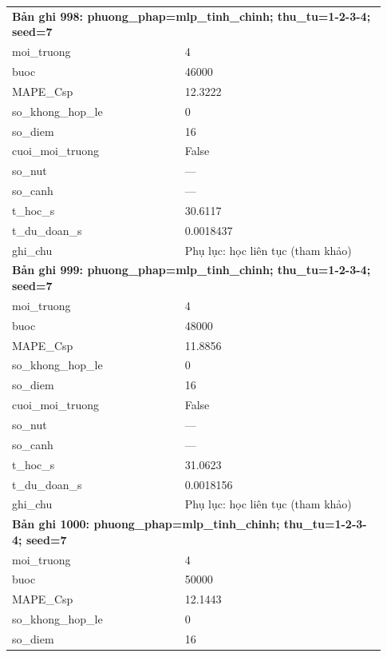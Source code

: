 \begin{longtable}{p{0.43\linewidth}p{0.50\linewidth}}
\midrule
\multicolumn{2}{p{0.95\linewidth}}{\textbf{Bản ghi 998: phuong\_phap=mlp\_tinh\_chinh; thu\_tu=1-2-3-4; seed=7}} \\
moi\_\allowbreak truong & 4 \\
buoc & 46000 \\
MAPE\_\allowbreak Csp & 12.3222 \\
so\_\allowbreak khong\_\allowbreak hop\_\allowbreak le & 0 \\
so\_\allowbreak diem & 16 \\
cuoi\_\allowbreak moi\_\allowbreak truong & False \\
so\_\allowbreak nut & — \\
so\_\allowbreak canh & — \\
t\_\allowbreak hoc\_\allowbreak s & 30.6117 \\
t\_\allowbreak du\_\allowbreak doan\_\allowbreak s & 0.0018437 \\
ghi\_\allowbreak chu & Phụ lục: học liên tục (tham khảo) \\
\midrule
\multicolumn{2}{p{0.95\linewidth}}{\textbf{Bản ghi 999: phuong\_phap=mlp\_tinh\_chinh; thu\_tu=1-2-3-4; seed=7}} \\
moi\_\allowbreak truong & 4 \\
buoc & 48000 \\
MAPE\_\allowbreak Csp & 11.8856 \\
so\_\allowbreak khong\_\allowbreak hop\_\allowbreak le & 0 \\
so\_\allowbreak diem & 16 \\
cuoi\_\allowbreak moi\_\allowbreak truong & False \\
so\_\allowbreak nut & — \\
so\_\allowbreak canh & — \\
t\_\allowbreak hoc\_\allowbreak s & 31.0623 \\
t\_\allowbreak du\_\allowbreak doan\_\allowbreak s & 0.0018156 \\
ghi\_\allowbreak chu & Phụ lục: học liên tục (tham khảo) \\
\midrule
\multicolumn{2}{p{0.95\linewidth}}{\textbf{Bản ghi 1000: phuong\_phap=mlp\_tinh\_chinh; thu\_tu=1-2-3-4; seed=7}} \\
moi\_\allowbreak truong & 4 \\
buoc & 50000 \\
MAPE\_\allowbreak Csp & 12.1443 \\
so\_\allowbreak khong\_\allowbreak hop\_\allowbreak le & 0 \\
so\_\allowbreak diem & 16 \\

\end{longtable}
